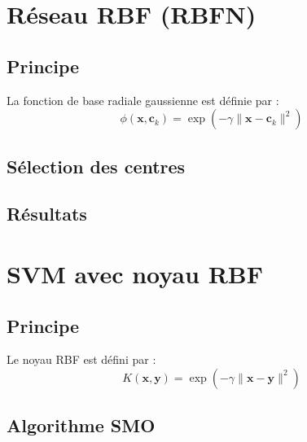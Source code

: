 \documentclass[12pt, a4paper]{report}
\begin{document}
\section{Réseau RBF (RBFN)}

\subsection{Principe}


La fonction de base radiale gaussienne est définie par :
\[
    \phi(\mathbf{x}, \mathbf{c}_k) = \exp\left(-\gamma \|\mathbf{x} - \mathbf{c}_k\|^2\right)
\]

\subsection{Sélection des centres}


\subsection{Résultats}


\section{SVM avec noyau RBF}

\subsection{Principe}


Le noyau RBF est défini par :
\[
    K(\mathbf{x}, \mathbf{y}) = \exp\left(-\gamma \|\mathbf{x} - \mathbf{y}\|^2\right)
\]

\subsection{Algorithme SMO}
\end{document}
